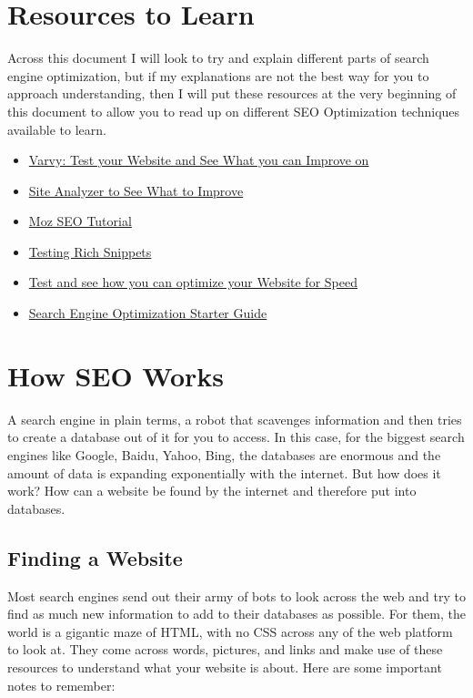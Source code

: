\documentclass{article}
\begin{document}
\tableofcontents

\newpage
{}

\section{Resources to Learn}
Across this document I will look to try and explain different parts of search engine optimization, but if my explanations are not the best way for you to approach understanding, then I will put these resources at the very beginning of this document to allow you to read up on different SEO Optimization techniques available to learn.

\begin{itemize}
\item \hyperlink{https://varvy.com/}{Varvy: Test your Website and See What you can Improve on}
\item \hyperlink{https://www.site-analyzer.com}{Site Analyzer to See What to Improve}
\item \hyperlink{https://moz.com/beginners-guide-to-seo}{Moz SEO Tutorial}
\item \hyperlink{http://www.google.com/webmasters/tools/richsnippets}{Testing Rich Snippets}
\item \hyperlink{https://developers.google.com/speed/pagespeed/insights/}{Test and see how you can optimize your Website for Speed}
\item \hyperlink{https://www.hildamateiu.com/docs/search-engine-optimization-starter-guide.pdf}{Search Engine Optimization Starter Guide}
\end{itemize}

\section{How SEO Works}
A search engine in plain terms, a robot that scavenges information and then tries to create a database out of it for you to access. In this case, for the biggest search engines like Google, Baidu, Yahoo, Bing, the databases are enormous and the amount of data is expanding exponentially with the internet. But how does it work? How can a website be found by the internet and therefore put into databases. 

\subsection{Finding a Website}
Most search engines send out their army of bots to look across the web and try to find as much new information to add to their databases as possible. For them, the world is a gigantic maze of HTML, with no CSS across any of the web platform to look at. They come across words, pictures, and links and make use of these resources to understand what your website is about. Here are some important notes to remember:
\end{document}
